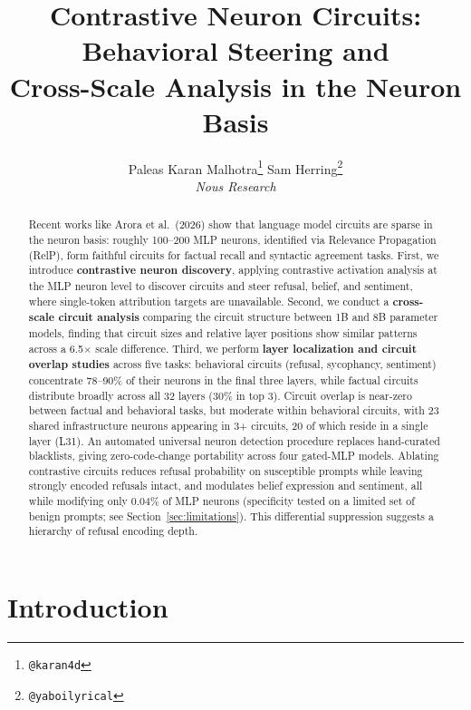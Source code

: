 \documentclass[11pt]{article}
\title{Contrastive Neuron Circuits: Behavioral Steering and \\ Cross-Scale Analysis in the Neuron Basis}
\author{%
  Paleas
  \quad
  Karan Malhotra\thanks{\texttt{@karan4d}}
  \quad
  Sam Herring\thanks{\texttt{@yaboilyrical}} \\[6pt]
  \textit{Nous Research}
}
\begin{document}
\maketitle

\begin{abstract}
Recent works like Arora et al.\ (2026) show that language model circuits are sparse in the neuron basis: roughly 100--200 MLP neurons, identified via Relevance Propagation (RelP), form faithful circuits for factual recall and syntactic agreement tasks.
First, we introduce \textbf{contrastive neuron discovery}, applying contrastive activation analysis at the MLP neuron level to discover circuits and steer refusal, belief, and sentiment, where single-token attribution targets are unavailable.
Second, we conduct a \textbf{cross-scale circuit analysis} comparing the circuit structure between 1B and 8B parameter models, finding that circuit sizes and relative layer positions show similar patterns across a 6.5$\times$ scale difference.
Third, we perform \textbf{layer localization and circuit overlap studies} across five tasks: behavioral circuits (refusal, sycophancy, sentiment) concentrate 78--90\% of their neurons in the final three layers, while factual circuits distribute broadly across all 32 layers (30\% in top 3).
Circuit overlap is near-zero between factual and behavioral tasks, but moderate within behavioral circuits, with 23 shared infrastructure neurons appearing in 3+ circuits, 20 of which reside in a single layer (L31).
An automated universal neuron detection procedure replaces hand-curated blacklists, giving zero-code-change portability across four gated-MLP models.
Ablating contrastive circuits reduces refusal probability on susceptible prompts while leaving strongly encoded refusals intact, and modulates belief expression and sentiment, all while modifying only 0.04\% of MLP neurons (specificity tested on a limited set of benign prompts; see Section~\ref{sec:limitations}).
This differential suppression suggests a hierarchy of refusal encoding depth.
\end{abstract}


\section{Introduction}
\label{sec:intro}
\end{document}
